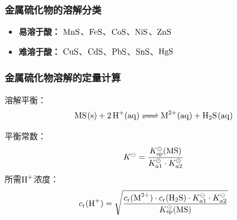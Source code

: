 \subsubsection{金属硫化物的溶解分类}
\begin{itemize}
    \item \textbf{易溶于酸：} $\ce{MnS}$、$\ce{FeS}$、$\ce{CoS}$、$\ce{NiS}$、$\ce{ZnS}$
    \item \textbf{难溶于酸：} $\ce{CuS}$、$\ce{CdS}$、$\ce{PbS}$、$\ce{SnS}$、$\ce{HgS}$
\end{itemize}

\subsubsection{金属硫化物溶解的定量计算}
溶解平衡：
\[
\ce{MS(s) + 2H+(aq) <=> M^{2+}(aq) + H2S(aq)}
\]

平衡常数：
\[
K^{\ominus} = \frac{K_{\text{sp}}^{\ominus}(\ce{MS})}{K_{a1}^{\ominus} \cdot K_{a2}^{\ominus}}
\]
所需$\ce{H+}$浓度：
\[
c_{\text{r}}(\ce{H+}) = \sqrt{\frac{c_{\text{r}}(\ce{M^{2+}}) \cdot c_{\text{r}}(\ce{H2S}) \cdot K_{a1}^{\ominus} \cdot K_{a2}^{\ominus}}{K_{\text{sp}}^{\ominus}(\ce{MS})}}
\]
